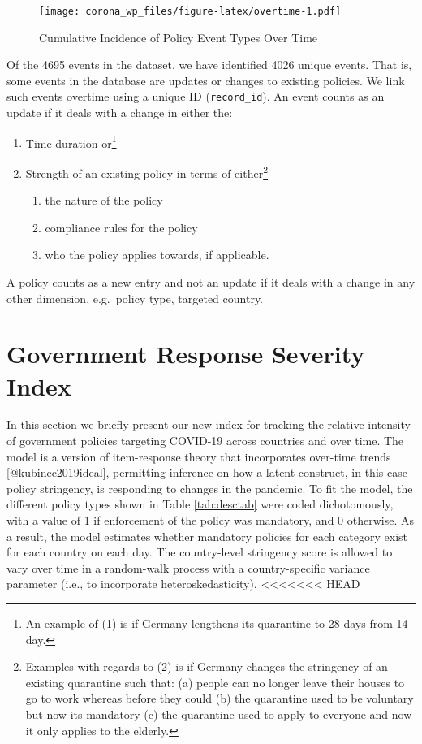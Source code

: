 \documentclass[]{article}
\providecommand{\tightlist}{%
  \setlength{\itemsep}{0pt}\setlength{\parskip}{0pt}}
\let\rmarkdownfootnote\footnote%
\def\footnote{\protect\rmarkdownfootnote}
\begin{document}
\begin{figure}
\centering
\texttt{[image: corona\_wp\_files/figure-latex/overtime-1.pdf]}
\caption{\label{fig:overtime}Cumulative Incidence of Policy Event Types Over Time}
\end{figure}

Of the 4695 events in the dataset, we have identified 4026 unique events. That is, some events in the database are updates or changes to existing policies. We link such events overtime using a unique ID (\texttt{record\_id}). An event counts as an update if it deals with a change in either the:

\begin{enumerate}
\def\labelenumi{\arabic{enumi}.}
\tightlist
\item
  Time duration or\footnote{An example of (1) is if Germany lengthens its quarantine to 28 days from 14 day.}
\item
  Strength of an existing policy in terms of either\footnote{Examples with regards to (2) is if Germany changes the stringency of an existing quarantine such that: (a) people can no longer leave their houses to go to work whereas before they could (b) the quarantine used to be voluntary but now its mandatory (c) the quarantine used to apply to everyone and now it only applies to the elderly.}

  \begin{enumerate}
  \def\labelenumii{\alph{enumii}.}
  \tightlist
  \item
    the nature of the policy
  \item
    compliance rules for the policy
  \item
    who the policy applies towards, if applicable.
  \end{enumerate}
\end{enumerate}

A policy counts as a new entry and not an update if it deals with a change in any other dimension, e.g.~policy type, targeted country.

\hypertarget{government-response-severity-index}{%
\section{Government Response Severity Index}\label{government-response-severity-index}}

In this section we briefly present our new index for tracking the relative intensity of government policies targeting COVID-19 across countries and over time. The model is a version of item-response theory that incorporates over-time trends {[}@kubinec2019ideal{]}, permitting inference on how a latent construct, in this case policy stringency, is responding to changes in the pandemic. To fit the model, the different policy types shown in Table \ref{tab:desctab} were coded dichotomously, with a value of 1 if enforcement of the policy was mandatory, and 0 otherwise. As a result, the model estimates whether mandatory policies for each category exist for each country on each day. The country-level stringency score is allowed to vary over time in a random-walk process with a country-specific variance parameter (i.e., to incorporate heteroskedasticity).
<<<<<<< HEAD
\end{document}
